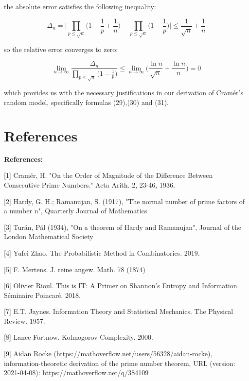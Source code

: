 \documentclass{article}
\begin{document}
the absolute error satisfies the following inequality:

\begin{equation}
\Delta_n = \Big\lvert \prod_{p \leq \sqrt{n}} \big(1- \frac{1}{p}+\frac{1}{n}\big) - \prod_{p \leq \sqrt{n}} \big(1- \frac{1}{p}\big)  \Big\rvert \leq \frac{1}{\sqrt{n}} + \frac{1}{n}
\end{equation}

so the relative error converges to zero:

\begin{equation}
\lim_{n \to \infty} \frac{\Delta_n}{\prod_{p \leq \sqrt{n}} \big(1- \frac{1}{p}\big)} \leq \lim_{n \to \infty} \big(\frac{\ln n}{\sqrt{n}} + \frac{\ln n}{n}\big) = 0
\end{equation}

which provides us with the necessary justifications in our derivation of Cramér's random model, specifically
formulas (29),(30) and (31).

\section*{References}

\small

\textbf{References:}

[1] Cramér, H. "On the Order of Magnitude of the Difference Between Consecutive Prime Numbers." Acta Arith. 2, 23-46, 1936.

[2] Hardy, G. H.; Ramanujan, S. (1917), "The normal number of prime factors of a number n", Quarterly Journal of Mathematics

[3] Turán, Pál (1934), "On a theorem of Hardy and Ramanujan", Journal of the London Mathematical Society

[4] Yufei Zhao. The Probabilistic Method in Combinatorics. 2019.

[5] F. Mertens. J. reine angew. Math. 78 (1874)

[6] Olivier Rioul. This is IT: A Primer on Shannon’s Entropy and Information. Séminaire Poincaré. 2018.

[7] E.T. Jaynes. Information Theory and Statistical Mechanics. The Physical Review. 1957.

[8] Lance Fortnow. Kolmogorov Complexity. 2000.

[9] Aidan Rocke (https://mathoverflow.net/users/56328/aidan-rocke), information-theoretic derivation of the prime number theorem, URL (version: 2021-04-08): https://mathoverflow.net/q/384109
\end{document}
